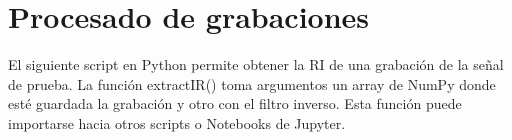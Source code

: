 \chapter{Procesado de grabaciones}
\label{ap:extractIR}

El siguiente script en Python permite obtener la RI de una grabación de la señal de prueba. La función extractIR() toma argumentos un array de NumPy donde esté guardada la grabación y otro con el filtro inverso. Esta función puede importarse hacia otros scripts o Notebooks de Jupyter.

